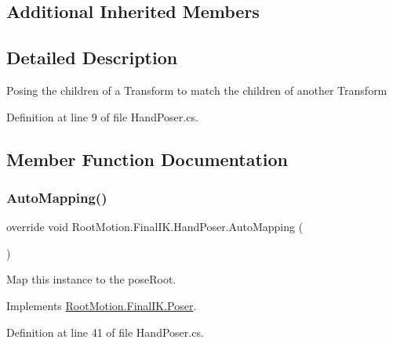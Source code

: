 \subsection*{Additional Inherited Members}


\subsection{Detailed Description}
Posing the children of a Transform to match the children of another Transform 



Definition at line 9 of file Hand\+Poser.\+cs.



\subsection{Member Function Documentation}
\mbox{\label{class_root_motion_1_1_final_i_k_1_1_hand_poser_a9e414a816ca5c67281de9160f250e408}} 
\subsubsection{\texorpdfstring{Auto\+Mapping()}{AutoMapping()}}
{\footnotesize\ttfamily override void Root\+Motion.\+Final\+I\+K.\+Hand\+Poser.\+Auto\+Mapping (\begin{DoxyParamCaption}{ }\end{DoxyParamCaption})\hspace{0.3cm}{\ttfamily [virtual]}}



Map this instance to the pose\+Root. 



Implements \mbox{\hyperlink{class_root_motion_1_1_final_i_k_1_1_poser_af8bf01f5bada3be99c43121b61022238}{Root\+Motion.\+Final\+I\+K.\+Poser}}.



Definition at line 41 of file Hand\+Poser.\+cs.

\mbox{\label{class_root_motion_1_1_final_i_k_1_1_hand_poser_af5d88be3e8ab503e82e27be0838dc586}} 
